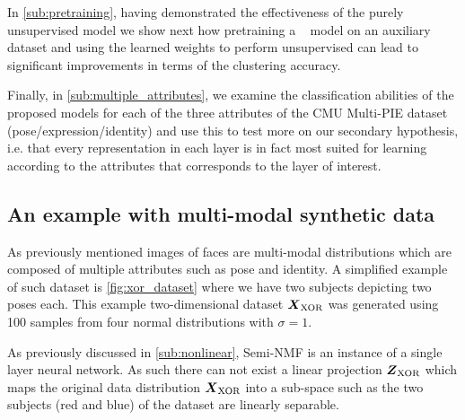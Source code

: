 \documentclass[10pt,journal,compsoc]{IEEEtran}
\begin{document}
In \autoref{sub:pretraining}, having demonstrated the effectiveness of the purely unsupervised \deepseminmf model we show next how pretraining a \dwsf~ model on an auxiliary dataset and using the learned weights to perform unsupervised \deepseminmf can lead to significant improvements in terms of the clustering accuracy. 

Finally, in \autoref{sub:multiple_attributes},  we examine the classification abilities of the proposed models for each of the three attributes of the CMU Multi-PIE dataset (pose/expression/identity) and use this to test more on our secondary hypothesis, i.e. that every representation in each layer is in fact most suited for learning according to the attributes that corresponds to the layer of interest.

\subsection{An example with multi-modal synthetic data}\label{sub:xor_problem}

As previously mentioned images of faces are multi-modal distributions which are composed of multiple attributes such as pose and identity. A simplified example of such dataset is \autoref{fig:xor_dataset} where we have two subjects depicting two poses each. This example two-dimensional dataset $\boldsymbol{X}_{\text{XOR}}$  was generated using 100 samples from four normal distributions with $\sigma=1$. 

As previously discussed in \autoref{sub:nonlinear}, Semi-NMF is an instance of a single layer neural network. As such there can not exist a linear projection $\boldsymbol{Z}_{\text{XOR}}$ which maps the original data distribution $\boldsymbol{X}_{\text{XOR}}$ into a sub-space such as the two subjects (red and blue) of the dataset are linearly separable. 
\end{document}
